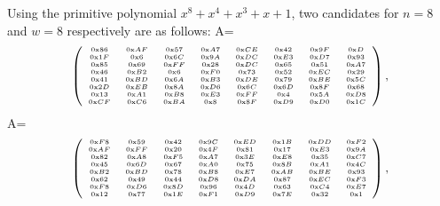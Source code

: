 
Using the primitive polynomial $x^8+x^4+x^3+x+1$, two candidates for $n = 8$ and $w = 8$ respectively are as follows:
\small
A=\[\tiny
\left(
\begin{array}{cccccccc}
\text{0x}86~& \text{0x}AF~& \text{0x}57~& \text{0x}A7~& \text{0x}CE~& \text{0x}42~& \text{0x}9F~& \text{0x}D\\
\text{0x}1F~& \text{0x}6~& \text{0x}6C~& \text{0x}9A~& \text{0x}DC~& \text{0x}E3~& \text{0x}D7~& \text{0x}93\\
\text{0x}85~& \text{0x}69~& \text{0x}FF~& \text{0x}28~& \text{0x}DC~& \text{0x}65~& \text{0x}51~& \text{0x}A7\\
\text{0x}46~& \text{0x}B2~& \text{0x}6~& \text{0x}F0~& \text{0x}73~& \text{0x}52~& \text{0x}EC~& \text{0x}29\\
\text{0x}41~& \text{0x}BD~& \text{0x}6A~& \text{0x}B3~& \text{0x}DE~& \text{0x}79~& \text{0x}BE~& \text{0x}5C\\
\text{0x}2D~& \text{0x}EB~& \text{0x}8A~& \text{0x}D6~& \text{0x}6C~& \text{0x}6D~& \text{0x}8F~& \text{0x}68\\
\text{0x}13~& \text{0x}A1~& \text{0x}B8~& \text{0x}E3~& \text{0x}FF~& \text{0x}4~& \text{0x}5A~& \text{0x}D8\\
\text{0x}CF~& \text{0x}C6~& \text{0x}BA~& \text{0x}8~& \text{0x}8F~& \text{0x}D9~& \text{0x}D0~& \text{0x}1C
\end{array}
\right),
\]
A=\[\tiny
\left(
\begin{array}{cccccccc}
\text{0x}F8~& \text{0x}59~& \text{0x}42~& \text{0x}9C~& \text{0x}ED~& \text{0x}1B~& \text{0x}DD~& \text{0x}F2\\
\text{0x}AF~& \text{0x}FF~& \text{0x}20~& \text{0x}4F~& \text{0x}81~& \text{0x}17~& \text{0x}E3~& \text{0x}9A\\
\text{0x}82~& \text{0x}A8~& \text{0x}F5~& \text{0x}A7~& \text{0x}3E~& \text{0x}E8~& \text{0x}35~& \text{0x}C7\\
\text{0x}45~& \text{0x}6D~& \text{0x}67~& \text{0x}A0~& \text{0x}75~& \text{0x}8B~& \text{0x}A1~& \text{0x}4C\\
\text{0x}B2~& \text{0x}BD~& \text{0x}78~& \text{0x}B8~& \text{0x}E7~& \text{0x}AB~& \text{0x}BE~& \text{0x}93\\
\text{0x}62~& \text{0x}49~& \text{0x}44~& \text{0x}D8~& \text{0x}DA~& \text{0x}87~& \text{0x}EC~& \text{0x}F3\\
\text{0x}F8~& \text{0x}D6~& \text{0x}8D~& \text{0x}96~& \text{0x}4D~& \text{0x}63~& \text{0x}C4~& \text{0x}E7\\
\text{0x}12~& \text{0x}77~& \text{0x}1E~& \text{0x}F1~& \text{0x}D9~& \text{0x}7E~& \text{0x}32~& \text{0x}1
\end{array}
\right),
\]
